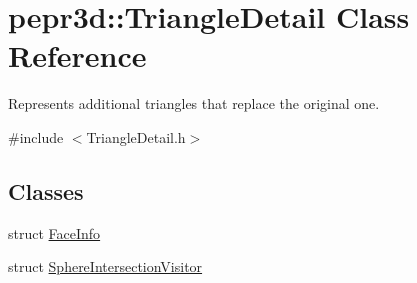 \hypertarget{classpepr3d_1_1_triangle_detail}{}\section{pepr3d\+::Triangle\+Detail Class Reference}
\label{classpepr3d_1_1_triangle_detail}


Represents additional triangles that replace the original one.  




{\ttfamily \#include $<$Triangle\+Detail.\+h$>$}

\subsection*{Classes}
\begin{DoxyCompactItemize}
\item 
struct \mbox{\hyperlink{structpepr3d_1_1_triangle_detail_1_1_face_info}{Face\+Info}}
\item 
struct \mbox{\hyperlink{structpepr3d_1_1_triangle_detail_1_1_sphere_intersection_visitor}{Sphere\+Intersection\+Visitor}}
\end{DoxyCompactItemize}
